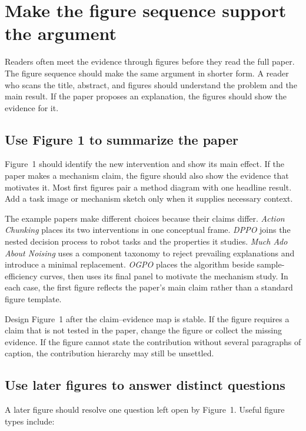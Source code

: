 \section{Make the figure sequence support the argument}
\label{sec:figures}

Readers often meet the evidence through figures before they read the full
paper. The figure sequence should make the same argument in shorter form. A
reader who scans the title, abstract, and figures should understand the problem
and the main result. If the paper proposes an explanation, the figures should
show the evidence for it.

\subsection{Use Figure 1 to summarize the paper}

Figure~1 should identify the new intervention and show its main effect. If the
paper makes a mechanism claim, the figure should also show the evidence that
motivates it. Most first figures pair a method diagram with one headline
result. Add a task image or mechanism sketch only when it supplies necessary
context.

The example papers make different choices because their claims differ.
\emph{Action Chunking} places its two interventions in one conceptual frame.
\emph{DPPO} joins the nested decision process to robot tasks and the properties
it studies. \emph{Much Ado About Noising} uses a component taxonomy to reject
prevailing explanations and introduce a minimal replacement. \emph{OGPO}
places the algorithm beside sample-efficiency curves, then uses its final
panel to motivate the mechanism study. In each case, the first figure reflects
the paper's main claim rather than a standard figure template.

Design Figure~1 after the claim--evidence map is stable. If the figure requires
a claim that is not tested in the paper, change the figure or collect the missing
evidence. If the figure cannot state the contribution without several
paragraphs of caption, the contribution hierarchy may still be unsettled.

\subsection{Use later figures to answer distinct questions}

A later figure should resolve one question left open by Figure~1. Useful figure
types include:

